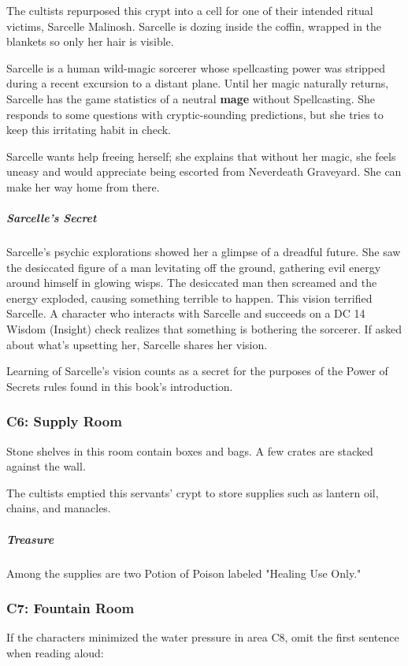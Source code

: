 \documentclass[10pt,a4paper,twoside,bg=print,twocolumn,openany,nodeprecatedcode]{dndbook}
\begin{document}
The cultists repurposed this crypt into a cell for one of their intended ritual victims, Sarcelle Malinosh. Sarcelle is dozing inside the coffin, wrapped in the blankets so only her hair is visible.

Sarcelle is a human wild-magic sorcerer whose spellcasting power was stripped during a recent excursion to a distant plane. Until her magic naturally returns, Sarcelle has the game statistics of a neutral \textbf{mage} without Spellcasting. She responds to some questions with cryptic-sounding predictions, but she tries to keep this irritating habit in check.

Sarcelle wants help freeing herself; she explains that without her magic, she feels uneasy and would appreciate being escorted from Neverdeath Graveyard. She can make her way home from there.

\subparagraph{Sarcelle's Secret}
Sarcelle's psychic explorations showed her a glimpse of a dreadful future. She saw the desiccated figure of a man levitating off the ground, gathering evil energy around himself in glowing wisps. The desiccated man then screamed and the energy exploded, causing something terrible to happen. This vision terrified Sarcelle. A character who interacts with Sarcelle and succeeds on a DC 14 Wisdom (Insight) check realizes that something is bothering the sorcerer. If asked about what's upsetting her, Sarcelle shares her vision.

Learning of Sarcelle's vision counts as a secret for the purposes of the Power of Secrets rules found in this book's introduction.

\subsubsection{C6: Supply Room}
\begin{DndReadAloud}{}
Stone shelves in this room contain boxes and bags. A few crates are stacked against the wall.

\end{DndReadAloud}

The cultists emptied this servants' crypt to store supplies such as lantern oil, chains, and manacles.

\subparagraph{Treasure}
Among the supplies are two Potion of Poison labeled "Healing Use Only."

\subsubsection{C7: Fountain Room}
If the characters minimized the water pressure in area C8, omit the first sentence when reading aloud:
\end{document}
